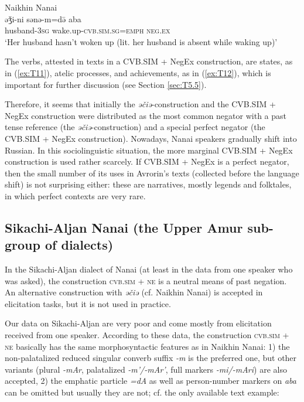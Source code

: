 \documentclass[output=paper]{langscibook}
\begin{document}
\ea Naikhin Nanai \label{ex:T12}\\
	\gll əǯi-ni	sənə-m=də̄	aba\\
	husband-\textsc{3sg}	wake.up-\textsc{cvb.sim.sg=emph}	\textsc{neg.ex}\\
	\glt `Her husband hasn’t woken up (lit. her husband is absent while waking up)' \citep[209, text]{avrorin1986a}
\z

The verbs, attested in texts in a CVB.SIM + NegEx construction, are states, as in (\ref{ex:T11}), atelic processes, and achievements, as in (\ref{ex:T12}), which is important for further discussion (see Section \ref{sec:T5.5}).

Therefore, it seems that initially the \textit{əčiə}-construction and the CVB.SIM + NegEx construction were distributed as the most common negator with a past tense reference (the \textit{əčiə}-construction) and a special perfect negator (the CVB.SIM + NegEx construction). Nowadays, Nanai speakers gradually shift into Russian. In this sociolinguistic situation, the more marginal CVB.SIM + NegEx construction is used rather scarcely. If CVB.SIM + NegEx is a perfect negator, then the small number of its uses in Avrorin’s texts (collected before the language shift) is not surprising either: these are narratives, mostly legends and folktales, in which perfect contexts are very rare.

\subsection{Sikachi-Aljan Nanai (the Upper Amur sub-group of dialects)}\label{sec:T5.2}

In the Sikachi-Aljan dialect of Nanai (at least in the data from one speaker who was asked), the construction \textsc{cvb.sim + ne} is a neutral means of past negation. An alternative construction with \textit{əčiə} (cf. Naikhin Nanai) is accepted in elicitation tasks, but it is not used in practice.

Our data on Sikachi-Aljan are very poor and come mostly from elicitation received from one speaker. According to these data, the construction \textsc{cvb.sim + ne} basically has the same morphosyntactic features as in Naikhin Nanai: 1) the non-palatalized reduced singular converb suffix \textit{-m} is the preferred one, but other variants (plural \textit{-mAr}, palatalized ­\textit{-m’/-mAr’}, full markers \textit{-mi/-mAri}) are also accepted, 2) the emphatic particle \textit{=dA} as well as person-number markers on \textit{aba} can be omitted but usually they are not; cf. the only available text example:
\end{document}
